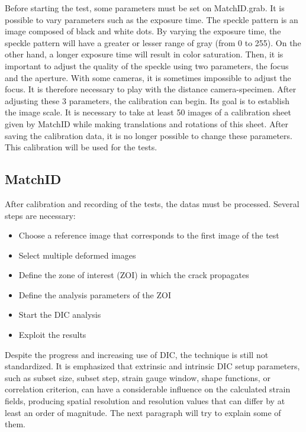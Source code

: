 Before starting the test, some parameters must be set on MatchID.grab. It is possible to vary parameters such as the exposure time. The speckle pattern is an image composed of black and white dots. By varying the exposure time, the speckle pattern will have a greater or lesser range of gray (from 0 to 255). On the other hand, a longer exposure time will result in color saturation. Then, it is important to adjust the quality of the speckle using two parameters, the focus and the aperture. With some cameras, it is sometimes impossible to adjust the focus. It is therefore necessary to play with the distance camera-specimen. After adjusting these 3 parameters, the calibration can begin. Its goal is to establish the image scale. It is necessary to take at least 50 images of a calibration sheet given by MatchID while making translations and rotations of this sheet.
After saving the calibration data, it is no longer possible to change these parameters. This calibration will be used for the tests.

\subsection{MatchID}

After calibration and recording of the tests, the datas must be processed. Several steps are necessary:

\begin{itemize}
	\item Choose a reference image that corresponds to the first image of the test 
	\item Select multiple deformed images
	\item Define the zone of interest (ZOI) in which the crack propagates
	\item Define the analysis parameters of the ZOI
	\item Start the DIC analysis
	\item Exploit the results
\end{itemize}

Despite the progress and increasing use of DIC, the technique is still not standardized. It is emphasized that extrinsic and intrinsic DIC setup parameters, such as subset size, subset step, strain gauge window, shape functions, or correlation criterion, can have a considerable influence on the calculated strain fields, producing spatial resolution and resolution values that can differ by at least an order of magnitude. The next paragraph will try to explain some of them. 

